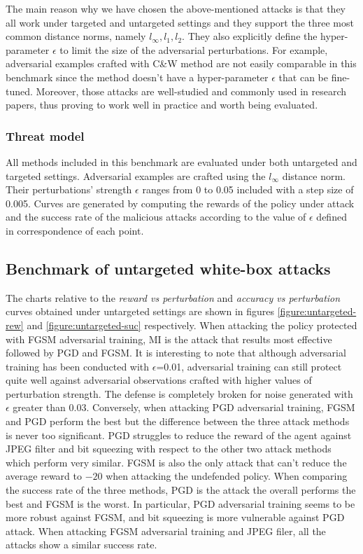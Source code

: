 The main reason why we have chosen the above-mentioned attacks is that they all work under targeted and untargeted settings and they support the three most common distance norms, namely \(l_\infty, l_1, l_2\). They also explicitly define the hyper-parameter \(\epsilon\) to limit the size of the adversarial perturbations. For example, adversarial examples crafted with C\&W method are not easily comparable in this benchmark since the method doesn't have a hyper-parameter \(\epsilon\) that can be fine-tuned. Moreover, those attacks are well-studied and commonly used in research papers, thus proving to work well in practice and worth being evaluated.

\subsubsection{Threat model}
All methods included in this benchmark are evaluated under both untargeted and targeted settings. Adversarial examples are crafted using the \(l_\infty\) distance norm. Their perturbations' strength \(\epsilon\) ranges from 0 to 0.05 included with a step size of 0.005. Curves are generated by computing the rewards of the policy under attack and the success rate of the malicious attacks according to the value of \(\epsilon\) defined in correspondence of each point.

\subsection{Benchmark of untargeted white-box attacks}
The charts relative to the {\it reward vs perturbation} and {\it accuracy vs perturbation} curves obtained under untargeted settings are shown in figures \ref{figure:untargeted-rew} and \ref{figure:untargeted-suc} respectively. When attacking the policy protected with FGSM adversarial training, MI is the attack that results most effective followed by PGD and FGSM. It is interesting to note that although adversarial training has been conducted with \(\epsilon\)=0.01, adversarial training can still protect quite well against adversarial observations crafted with higher values of perturbation strength. The defense is completely broken for noise generated with \(\epsilon\) greater than 0.03. Conversely, when attacking PGD adversarial training, FGSM and PGD perform the best but the difference between the three attack methods is never too significant. PGD struggles to reduce the reward of the agent against JPEG filter and bit squeezing with respect to the other two attack methods which perform very similar. FGSM is also the only attack that can't reduce the average reward to \(-20\) when attacking the undefended policy. When comparing the success rate of the three methods, PGD is the attack the overall performs the best and FGSM is the worst. In particular, PGD adversarial training seems to be more robust against FGSM, and bit squeezing is more vulnerable against PGD attack. When attacking FGSM adversarial training and JPEG filer, all the attacks show a similar success rate.


